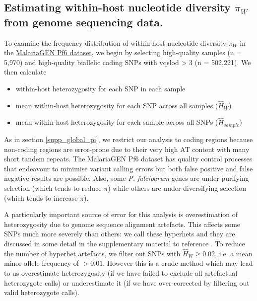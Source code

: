 \documentclass[_main.tex]{subfiles}
\begin{document}

\subsection{Estimating within-host nucleotide diversity $\pi_W$ from genome sequencing data.}
\label{supp_Q_pi}

To examine the frequency distribution of within-host nucleotide diversity $\pi_W$ in the \href{https://www.malariagen.net/resource/26}{MalariaGEN Pf6 dataset}, we begin by selecting high-quality samples (n = 5,970) and high-quality biallelic coding SNPs with vqslod > 3 (n = 502,221).   We then calculate

\begin{itemize}[noitemsep]

\item within-host heterozygosity for each SNP in each sample

\item mean within-host heterozygosity for each SNP across all samples ($\widehat{H}_W$)

\item mean within-host heterozygosity for each sample across all SNPs ($\widehat{H}_{sample}$)

\end{itemize}

As in section \ref{supp_global_pi}, we restrict our analysis to coding regions because non-coding regions are error-prone due to their very high AT content with many short tandem repeats.  The MalariaGEN Pf6 dataset has quality control processes that endeavour to minimise variant calling errors but both false positive and false negative results are possible. Also, some \textit{P. falciparum} genes are under purifying selection (which tends to reduce $\pi$) while others are under diversifying selection (which tends to increase $\pi$).  

A particularly important source of error for this analysis is overestimation of heterozygosity due to genome sequence alignment artefacts.  This affects some SNPs much more severely than others: we call these hyperhets and they are discussed in some detail in the supplementary material to reference \cite{Manske2012}.  To reduce the number of hyperhet artefacts, we filter out SNPs with $\widehat{H}_W \ge 0.02$, i.e. a mean minor allele frequency of $>0.01$.   However this is a crude method which may lead to us overestimate heterozygosity (if we have failed to exclude all artefactual heterozygote calls) or underestimate it (if we have over-corrected by filtering out valid heterozygote calls).
\end{document}
